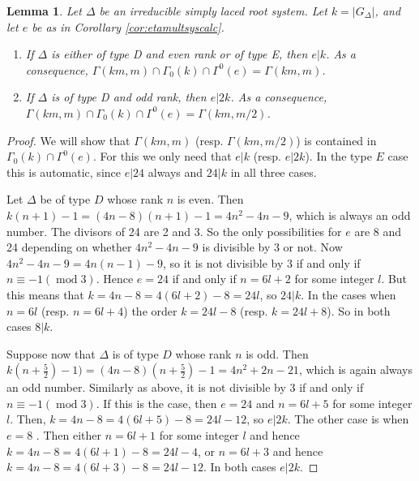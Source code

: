\documentclass{article}
\newtheorem{lemma}[theorem]{Lemma}
\theoremstyle{definition}
\begin{document}
\begin{lemma} 
	\label{lem:grpint}
	Let $\Delta$ be an irreducible simply laced root system. Let $k=|G_{\Delta}|$, and let $e$ be as in Corollary \ref{cor:etamultsyscalc}. 
	\begin{enumerate}
		\item If $\Delta$ is either of type D and even rank or of type E, then $e|k$. As a consequence, $\Gamma(km,m) \cap \Gamma_0(k) \cap \Gamma^0(e)=\Gamma(km,m)$.
		\item If $\Delta$ is of type D and odd rank, then $e|2k$. As a consequence, $\Gamma(km,m) \cap \Gamma_0(k) \cap \Gamma^0(e)=\Gamma(km,m/2)$.
	\end{enumerate}
\end{lemma}
\begin{proof}
	We will show that $\Gamma(km,m)$ (resp. $\Gamma(km,m/2)$) is contained in $\Gamma_0(k) \cap \Gamma^0(e)$. For this we only need that $e|k$ (resp. $e|2k$). In the type $E$ case this is automatic, since $e|24$ always and $24|k$ in all three cases.
	
	Let $\Delta$ be of type $D$ whose rank $n$ is even. Then $k(n+1)-1=(4n-8)(n+1)-1=4n^2-4n-9$, which is always an odd number. The divisors of 24 are 2 and 3. So the only possibilities for $e$ are 8 and 24 depending on whether $4n^2-4n-9$ is divisible by 3 or not. Now $4n^2-4n-9=4n(n-1)-9$, so it is not divisible by 3 if and only if $n \equiv -1 (\; \mathrm{mod}\; 3)$. Hence $e=24$ if and only if $n=6l+2$ for some integer $l$. But this means that $k=4n-8=4(6l+2)-8=24l$, so $24|k$. In the cases when $n=6l$ (resp. $n=6l+4$) the order $k=24l-8$ (resp. $k=24l+8$). So in both cases $8|k$. 
	
	Suppose now that $\Delta$ is of type $D$ whose rank $n$ is odd. Then $k(n+\frac{5}{2})-1)=(4n-8)(n+\frac{5}{2})-1=4n^2+2n-21$, which is again always an odd number. Similarly as above, it is not divisible by 3 if and only if $n \equiv -1 (\; \mathrm{mod}\; 3)$.
	If this is the case, then $e=24$ and $n=6l+5$ for some integer $l$. Then, $k=4n-8=4(6l+5)-8=24l-12$, so $e|2k$.
	The other case is when $e=8$ . Then either $n=6l+1$ for some integer $l$ and hence $k=4n-8=4(6l+1)-8=24l-4$, or $n=6l+3$ and hence $k=4n-8=4(6l+3)-8=24l-12$. In both cases $e|2k$.
\end{proof}
\end{document}
